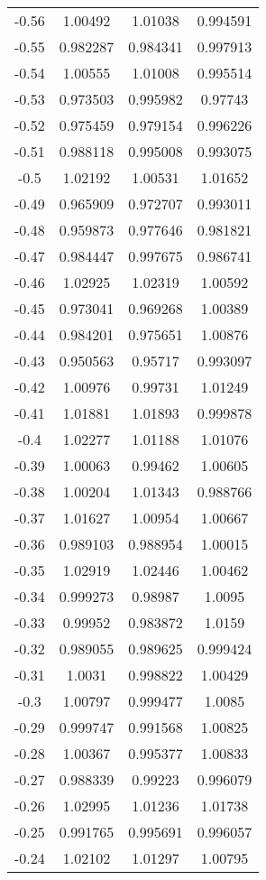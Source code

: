 \begin{table}[h!]
\begin{tabular}{|c|c|c|c|}
-0.56 & 1.00492 & 1.01038 & 0.994591 \\
-0.55 & 0.982287 & 0.984341 & 0.997913 \\
-0.54 & 1.00555 & 1.01008 & 0.995514 \\
-0.53 & 0.973503 & 0.995982 & 0.97743 \\
-0.52 & 0.975459 & 0.979154 & 0.996226 \\
-0.51 & 0.988118 & 0.995008 & 0.993075 \\
-0.5 & 1.02192 & 1.00531 & 1.01652 \\
-0.49 & 0.965909 & 0.972707 & 0.993011 \\
-0.48 & 0.959873 & 0.977646 & 0.981821 \\
-0.47 & 0.984447 & 0.997675 & 0.986741 \\
-0.46 & 1.02925 & 1.02319 & 1.00592 \\
-0.45 & 0.973041 & 0.969268 & 1.00389 \\
-0.44 & 0.984201 & 0.975651 & 1.00876 \\
-0.43 & 0.950563 & 0.95717 & 0.993097 \\
-0.42 & 1.00976 & 0.99731 & 1.01249 \\
-0.41 & 1.01881 & 1.01893 & 0.999878 \\
-0.4 & 1.02277 & 1.01188 & 1.01076 \\
-0.39 & 1.00063 & 0.99462 & 1.00605 \\
-0.38 & 1.00204 & 1.01343 & 0.988766 \\
-0.37 & 1.01627 & 1.00954 & 1.00667 \\
-0.36 & 0.989103 & 0.988954 & 1.00015 \\
-0.35 & 1.02919 & 1.02446 & 1.00462 \\
-0.34 & 0.999273 & 0.98987 & 1.0095 \\
-0.33 & 0.99952 & 0.983872 & 1.0159 \\
-0.32 & 0.989055 & 0.989625 & 0.999424 \\
-0.31 & 1.0031 & 0.998822 & 1.00429 \\
-0.3 & 1.00797 & 0.999477 & 1.0085 \\
-0.29 & 0.999747 & 0.991568 & 1.00825 \\
-0.28 & 1.00367 & 0.995377 & 1.00833 \\
-0.27 & 0.988339 & 0.99223 & 0.996079 \\
-0.26 & 1.02995 & 1.01236 & 1.01738 \\
-0.25 & 0.991765 & 0.995691 & 0.996057 \\
-0.24 & 1.02102 & 1.01297 & 1.00795 \\

\end{tabular}
\end{table}
